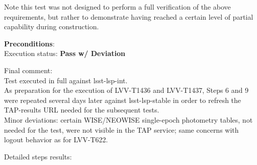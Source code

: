 \documentclass[DM,lsstdraft,STR,toc]{lsstdoc}
\begin{document}
Note this test was not designed to perform a full verification of the
above requirements, but rather to demonstrate having reached a certain
level of partial capability during construction.


\textbf{ Preconditions}:\\


Execution status: {\bf Pass w/ Deviation }

Final comment:\\Test executed in full against lsst-lsp-int.\\
As preparation for the execution of LVV-T1436 and LVV-T1437, Steps 6 and
9 were repeated several days later against lsst-lsp-stable in order to
refresh the TAP-results URL needed for the subsequent tests.\\
Minor deviations: certain WISE/NEOWISE single-epoch photometry tables,
not needed for the test, were not visible in the TAP service; same
concerns with logout behavior as for LVV-T622.



Detailed steps results:
\end{document}
